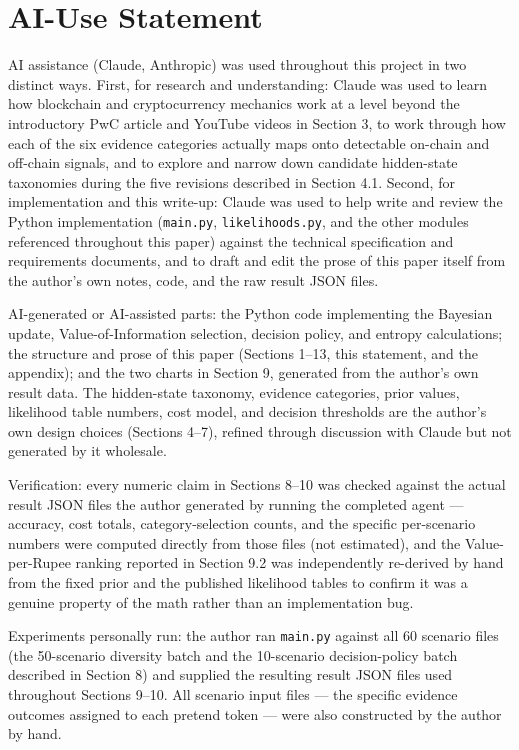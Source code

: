 \documentclass[11pt]{article}
\begin{document}
\section*{AI-Use Statement}

AI assistance (Claude, Anthropic) was used throughout this project in two distinct ways. First, for research and understanding: Claude was used to learn how blockchain and cryptocurrency mechanics work at a level beyond the introductory PwC article and YouTube videos in Section 3, to work through how each of the six evidence categories actually maps onto detectable on-chain and off-chain signals, and to explore and narrow down candidate hidden-state taxonomies during the five revisions described in Section 4.1. Second, for implementation and this write-up: Claude was used to help write and review the Python implementation (\texttt{main.py}, \texttt{likelihoods.py}, and the other modules referenced throughout this paper) against the technical specification and requirements documents, and to draft and edit the prose of this paper itself from the author's own notes, code, and the raw result JSON files.

AI-generated or AI-assisted parts: the Python code implementing the Bayesian update, Value-of-Information selection, decision policy, and entropy calculations; the structure and prose of this paper (Sections 1--13, this statement, and the appendix); and the two charts in Section 9, generated from the author's own result data. The hidden-state taxonomy, evidence categories, prior values, likelihood table numbers, cost model, and decision thresholds are the author's own design choices (Sections 4--7), refined through discussion with Claude but not generated by it wholesale.

Verification: every numeric claim in Sections 8--10 was checked against the actual result JSON files the author generated by running the completed agent --- accuracy, cost totals, category-selection counts, and the specific per-scenario numbers were computed directly from those files (not estimated), and the Value-per-Rupee ranking reported in Section 9.2 was independently re-derived by hand from the fixed prior and the published likelihood tables to confirm it was a genuine property of the math rather than an implementation bug.

Experiments personally run: the author ran \texttt{main.py} against all 60 scenario files (the 50-scenario diversity batch and the 10-scenario decision-policy batch described in Section 8) and supplied the resulting result JSON files used throughout Sections 9--10. All scenario input files --- the specific evidence outcomes assigned to each pretend token --- were also constructed by the author by hand.
\end{document}
